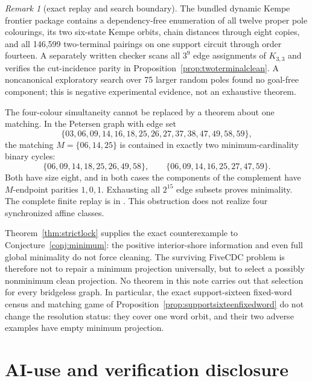 \documentclass[11pt]{article}
\theoremstyle{definition}
\theoremstyle{remark}
\newtheorem{remark}[theorem]{Remark}
\begin{document}
\begin{remark}[exact replay and search boundary]
The bundled dynamic Kempe frontier package contains a dependency-free
enumeration of all twelve proper pole colourings, its two six-state Kempe
orbits, chain distances through eight copies, and all 146,599 two-terminal
pairings on one support circuit through order fourteen.  A separately
written checker scans all \(3^9\) edge assignments of \(K_{3,3}\) and
verifies the cut-incidence parity in
Proposition~\ref{prop:twoterminalclean}.  A noncanonical exploratory search
over 75 larger random poles found no goal-free component; this is negative
experimental evidence, not an exhaustive theorem.
\end{remark}

The four-colour simultaneity cannot be replaced by a theorem about one
matching.  In the Petersen graph with edge set
\[
\{03,06,09,14,16,18,25,26,27,37,38,47,49,58,59\},
\]
the matching \(M=\{06,14,25\}\) is contained in exactly two
minimum-cardinality binary cycles:
\[
\{06,09,14,18,25,26,49,58\},\qquad
\{06,09,14,16,25,27,47,59\}.
\]
Both have size eight, and in both cases the components of the complement
have \(M\)-endpoint parities \(1,0,1\).  Exhausting all \(2^{15}\) edge
subsets proves minimality.  The complete finite replay is in
.  This
obstruction does not realize four synchronized affine classes.

Theorem~\ref{thm:strictlock} supplies the exact counterexample to
Conjecture~\ref{conj:minimum}: the positive interior-shore information and
even full global minimality do not force cleaning.  The surviving FiveCDC
problem is therefore not to repair a minimum projection universally, but
to select a possibly nonminimum clean projection.  No theorem in this
note carries out that selection for every bridgeless graph.  In particular,
the exact support-sixteen fixed-word census and matching game of
Proposition~\ref{prop:supportsixteenfixedword} do not change the resolution
status: they cover one word orbit, and their two adverse examples have
empty minimum projection.

\section*{AI-use and verification disclosure}
\end{document}
